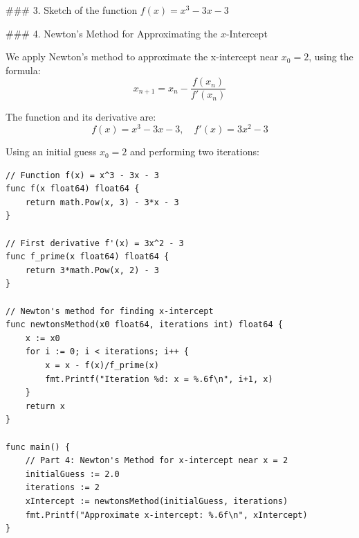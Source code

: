 \documentclass[11pt]{article}
\begin{document}
### 3. Sketch of the function \( f(x) = x^3 - 3x - 3 \)

\begin{center}
\end{center}

### 4. Newton's Method for Approximating the \( x \)-Intercept

We apply Newton's method to approximate the x-intercept near \( x_0 = 2 \), using the formula:
\[
x_{n+1} = x_n - \frac{f(x_n)}{f'(x_n)}
\]

The function and its derivative are:
\[
f(x) = x^3 - 3x - 3, \quad f'(x) = 3x^2 - 3
\]

Using an initial guess \( x_0 = 2 \) and performing two iterations:

\begin{verbatim}
// Function f(x) = x^3 - 3x - 3
func f(x float64) float64 {
    return math.Pow(x, 3) - 3*x - 3
}

// First derivative f'(x) = 3x^2 - 3
func f_prime(x float64) float64 {
    return 3*math.Pow(x, 2) - 3
}

// Newton's method for finding x-intercept
func newtonsMethod(x0 float64, iterations int) float64 {
    x := x0
    for i := 0; i < iterations; i++ {
        x = x - f(x)/f_prime(x)
        fmt.Printf("Iteration %d: x = %.6f\n", i+1, x)
    }
    return x
}

func main() {
    // Part 4: Newton's Method for x-intercept near x = 2
    initialGuess := 2.0
    iterations := 2
    xIntercept := newtonsMethod(initialGuess, iterations)
    fmt.Printf("Approximate x-intercept: %.6f\n", xIntercept)
}
\end{verbatim}
\end{document}
